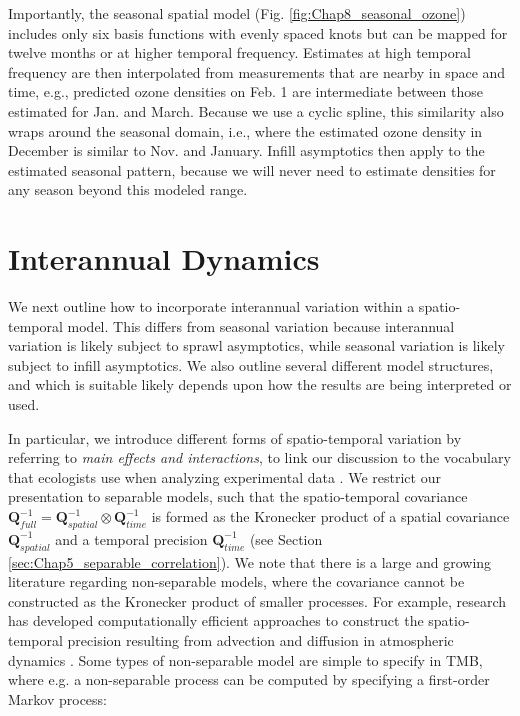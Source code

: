 Importantly, the seasonal spatial model (Fig. \ref{fig:Chap8_seasonal_ozone}) includes only six basis functions with evenly spaced knots but can be mapped for twelve months or at higher temporal frequency. Estimates at high temporal frequency are then interpolated from measurements that are nearby in space and time, e.g., predicted ozone densities on Feb. 1 are intermediate between those estimated for Jan. and March.  Because we use a cyclic spline, this similarity also wraps around the seasonal domain, i.e., where the estimated ozone density in December is similar to Nov. and January.  Infill asymptotics then apply to the estimated seasonal pattern, because we will never need to estimate densities for any season beyond this modeled range. 

\section{Interannual Dynamics} \label{sec:Chap8_interannual_dynamics}

We next outline how to incorporate interannual variation within a spatio-temporal model.  This differs from seasonal variation because interannual variation is likely subject to sprawl asymptotics, while seasonal variation is likely subject to infill asymptotics.  We also outline several different model structures, and which is suitable likely depends upon how the results are being interpreted or used.  

In particular, we introduce different forms of spatio-temporal variation by referring to \textit{main effects and interactions}, to link our discussion to the vocabulary that ecologists use when analyzing experimental data \cite{zuur_mixed_2009}.  We restrict our presentation to separable models, such that the spatio-temporal covariance \(\mathbf{Q}_{full}^{-1} = \mathbf{Q}_{spatial}^{-1} \otimes \mathbf{Q}_{time}^{-1} \) is formed as the Kronecker product of a spatial covariance \(\mathbf{Q}_{spatial}^{-1}\) and a temporal precision \(\mathbf{Q}_{time}^{-1}\) (see Section \ref{sec:Chap5_separable_correlation}).  We note that there is a large and growing literature regarding non-separable models, where the covariance cannot be constructed as the Kronecker product of smaller processes.  For example, research has developed computationally efficient approaches to construct the spatio-temporal precision resulting from advection and diffusion in atmospheric dynamics \cite{clarotto_spde_2023}.  Some types of non-separable model are simple to specify in TMB, where e.g. a non-separable process can be computed by specifying a first-order Markov process:

